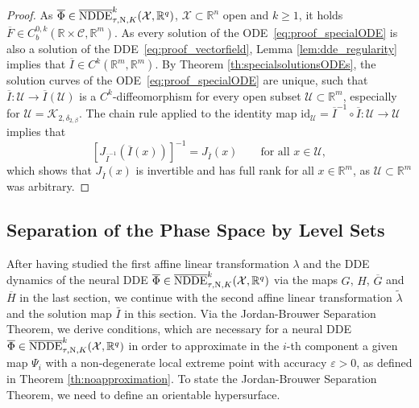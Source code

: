 \documentclass[10pt]{article}
\numberwithin{equation}{section}
\newcommand{\eps}{\varepsilon}
\begin{document}
	\begin{proof}
		As $\overline{\Phi}\in\overline{\textup{NDDE}}^k_{\tau,\textup{N},K}(\mathcal{X},\mathbb{R}^q)$, $\mathcal{X}\subset \mathbb{R}^n$ open and $k \geq 1$, it holds  $\overline{F}\in C_b^{0,k}(\mathbb{R}\times \mathcal{C},\mathbb{R}^m)$. As every solution of the ODE~\eqref{eq:proof_specialODE} is also a solution of the DDE~\eqref{eq:proof_vectorfield}, Lemma \ref{lem:dde_regularity} implies that $\overline{I}\in C^k(\mathbb{R}^m,\mathbb{R}^m)$. By Theorem \ref{th:specialsolutionsODEs}, the solution curves of the ODE~\eqref{eq:proof_specialODE} are unique, such that $\overline{I}: \mathcal{U} \rightarrow \overline{I}(\mathcal{U})$ is a $C^k$-diffeomorphism for every open subset $\mathcal{U}\subset \mathbb{R}^m$, especially for $\mathcal{U} = \mathcal{K}_{2,\delta_{2,\beta}}$. The chain rule applied to the identity map $\text{id}_\mathcal{U} =  \overline{I}^{-1}\circ \overline{I}: \mathcal{U}\rightarrow \mathcal{U}$ implies  that  $$\left[J_{\overline{I}^{-1}}(\overline{I}(x)) \right]^{-1}= J_{\overline{I}}(x) \qquad \text{for all } x \in \mathcal{U},$$
		which shows that $J_{\overline{I}}(x)$ is invertible and has full rank for all $x\in \mathbb{R}^m$, as $\mathcal{U}\subset \mathbb{R}^m$ was arbitrary.
	\end{proof}
	
	\subsection{Separation of the Phase Space by Level Sets}
	\label{sec:levelsets}
	
	After having studied the first affine linear transformation $\lambda$ and the DDE dynamics of the neural DDE $\overline{\Phi}\in\overline{\textup{NDDE}}^k_{\tau,\textup{N},K}(\mathcal{X},\mathbb{R}^q)$ via the maps $G$, $H$, $\overline{G}$ and $\overline{H}$ in the last section, we continue with the second affine linear transformation $\tilde \lambda$ and the solution map $\bar{I}$ in this section. Via the Jordan-Brouwer Separation Theorem, we derive conditions, which are necessary for a neural DDE $\overline{\Phi}\in\overline{\textup{NDDE}}^k_{\tau,\textup{N},K}(\mathcal{X},\mathbb{R}^q)$ in order to approximate in the $i$-th component a given map $\Psi_i$ with a non-degenerate local extreme point with accuracy $\eps>0$, as defined in Theorem \ref{th:noapproximation}. To state the Jordan-Brouwer Separation Theorem, we need to define an orientable hypersurface.
	
\end{document}
